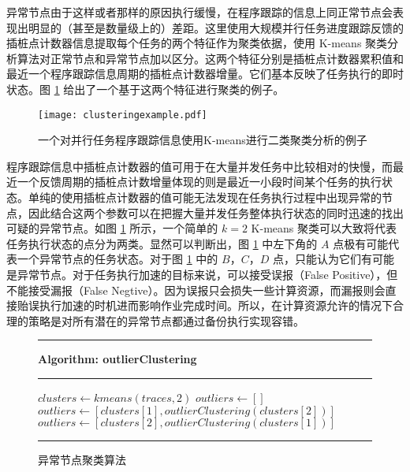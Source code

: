 异常节点由于这样或者那样的原因执行缓慢，在程序跟踪的信息上同正常节点会表现出明显的（甚至是数量级上的）差距。这里使用大规模并行任务进度跟踪反馈的插桩点计数器信息提取每个任务的两个特征作为聚类依据，使用 K-means 聚类分析算法对正常节点和异常节点加以区分。这两个特征分别是插桩点计数器累积值和最近一个程序跟踪信息周期的插桩点计数器增量。它们基本反映了任务执行的即时状态。图 \ref{figure:clusteringexample} 给出了一个基于这两个特征进行聚类的例子。
\begin{figure}
  \centering
  \texttt{[image: clusteringexample.pdf]}
  \caption{一个对并行任务程序跟踪信息使用K-means进行二类聚类分析的例子}
  \label{figure:clusteringexample}
\end{figure}

程序跟踪信息中插桩点计数器的值可用于在大量并发任务中比较相对的快慢，而最近一个反馈周期的插桩点计数增量体现的则是最近一小段时间某个任务的执行状态。单纯的使用插桩点计数器的值可能无法发现在任务执行过程中出现异常的节点，因此结合这两个参数可以在把握大量并发任务整体执行状态的同时迅速的找出可疑的异常节点。如图 \ref{figure:clusteringexample} 所示，一个简单的 $k = 2$ K-means 聚类可以大致将代表任务执行状态的点分为两类。显然可以判断出，图 \ref{figure:clusteringexample} 中左下角的 $A$ 点极有可能代表一个异常节点的任务状态。对于图 \ref{figure:clusteringexample} 中的 $B$，$C$，$D$ 点，只能认为它们有可能是异常节点。对于任务执行加速的目标来说，可以接受误报（False Positive），但不能接受漏报（False Negtive）。因为误报只会损失一些计算资源，而漏报则会直接贻误执行加速的时机进而影响作业完成时间。所以，在计算资源允许的情况下合理的策略是对所有潜在的异常节点都通过备份执行实现容错。
\begin{figure}
\rule[-.2pt]{0.9\textwidth}{0.9pt}

\textbf{Algorithm: outlierClustering}

\rule[-.2pt]{0.9\textwidth}{0.5pt}

\begin{algorithmic}[1]

\State $clusters\gets kmeans(traces, 2)$
\State $outliers\gets[]$
        \State $outliers\gets [clusters[1], outlierClustering(clusters[2])]$
        \State $outliers\gets [clusters[2], outlierClustering(clusters[1])]$
    \EndIf
\EndIf
\State {}
\end{algorithmic}
\rule[-.2pt]{0.9\textwidth}{0.8pt}
\caption{异常节点聚类算法}\label{fig-outlier-algo}
\end{figure}

